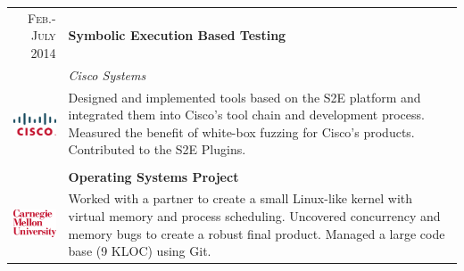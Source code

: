 \documentclass[a4paper,11pt]{article} %
\begin{document}
\begin{tabularx}{\textwidth}{r|X}

\textsc{Feb.-July 2014} & \textbf{Symbolic Execution Based Testing} \\
\multirow{4}{*}{ \includegraphics[width=60pt]{img/cisco.eps}}
& \emph{Cisco Systems}\\ 
& \footnotesize{Designed and implemented tools based on the S2E platform and
integrated them into Cisco's tool chain and development process. Measured the
benefit of white-box fuzzing for Cisco's products. Contributed to the S2E
Plugins.}\\
\multicolumn{2}{c}{} \\


\textsc{Jan.-May 2013} & \textbf{Operating Systems Project}\\
\multirow{3}{*}{ \includegraphics[width=55pt]{img/cmu.eps}}
& \footnotesize{Worked with a partner to create a small Linux-like kernel
with virtual memory and process scheduling. Uncovered concurrency and memory
bugs to create a robust final product. Managed a large code base (9 KLOC) using Git.}\\


\end{tabularx}

\end{document}
